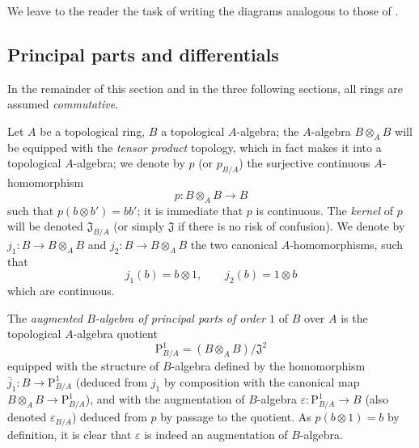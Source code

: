We leave to the reader the task of writing the diagrams analogous to those of .

\subsection{Principal parts and differentials}
\label{subsection:0.20.4}

In the remainder of this section and in the three following sections, all rings are assumed \emph{commutative}.

\begin{env}[20.4.1]
\label{0.20.4.1}
Let $A$ be a topological ring, $B$ a topological $A$-algebra; the $A$-algebra $B\otimes_A B$ will be equipped with the \emph{tensor product} topology, which in fact makes it into a topological $A$-algebra; we denote by $p$ (or $p_{B/A}$) the surjective continuous $A$-homomorphism
\begin{equation}
\tag{20.4.1.1}
  \label{0.20.4.1.1}
  p:B\otimes_A B\to B
\end{equation}
such that $p(b\otimes b')=bb'$; it is immediate that $p$ is continuous.
The \emph{kernel} of $p$ will be denoted $\mathfrak{J}_{B/A}$ (or simply $\mathfrak{J}$ if there is no risk of confusion).
We denote by $j_1:B\to B\otimes_A B$ and $j_2:B\to B\otimes_A B$ the two canonical $A$-homomorphisms, such that
\[
  j_1(b) = b\otimes 1, \qquad j_2(b) = 1\otimes b
\]
which are continuous.
\end{env}

\begin{definition}[20.4.2]
\label{0.20.4.2}
The \emph{augmented $B$-algebra of principal parts of order $1$} of $B$ over $A$ is the topological $A$-algebra quotient
\begin{equation}
\tag{20.4.2.1}
  \label{0.20.4.2.1}
  \mathrm{P}^1_{B/A} = (B\otimes_A B)/\mathfrak{J}^2
\end{equation}
equipped with the structure of $B$-algebra defined by the homomorphism $\bar{j}_1:B\to\mathrm{P}^1_{B/A}$ (deduced from $j_1$ by composition with the canonical map $B\otimes_A B\to\mathrm{P}^1_{B/A}$), and with the augmentation of $B$-algebra $\varepsilon:\mathrm{P}^1_{B/A}\to B$ (also denoted $\varepsilon_{B/A}$) deduced from $p$ by passage to the quotient.
As $p(b\otimes 1)=b$ by definition, it is clear that $\varepsilon$ is indeed an augmentation of $B$-algebra.
\end{definition}

